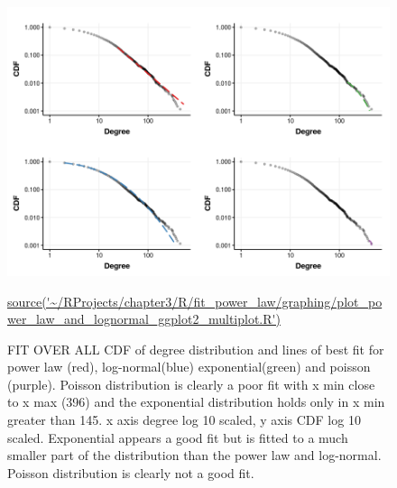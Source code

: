 \begin{figure}
    \centering
    \includegraphics[width=\textwidth]{images/chapter3/poweRlaw/multiplot/Rplot_multiplot_with_x_min_each_distribution.png}
    \caption{FIT OVER ALL CDF of degree distribution and lines of best fit for power law (red), log-normal(blue) exponential(green) and poisson (purple). Poisson distribution is clearly a poor fit with x min close to x max (396) and the exponential distribution holds only in x min greater than 145. x axis degree log 10 scaled, y axis CDF log 10 scaled. Exponential appears a good fit but is fitted to a much smaller part of the distribution than the power law and log-normal. Poisson distribution is clearly not a good fit.}
    \small\url{source('~/RProjects/chapter3/R/fit_power_law/graphing/plot_power_law_and_lognormal_ggplot2_multiplot.R')}
    \label{fig:CDF degreel_multiplot}
\end{figure}

